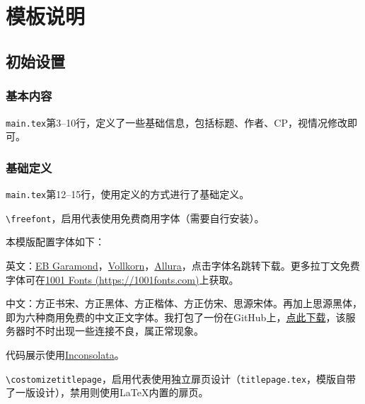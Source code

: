 \documentclass[10pt,openany]{book}
\title{\mytitleen\\\mytitle}
\author{\myauthor}
\date{}
\def\costomizetitlepage{} %
\begin{document}
\pagestyle{mystyle}

\ifdefined\costomizetitlepage
    
\else
    \maketitle
\fi

\tocgeo
\tableofcontents
\thispagestyle{empty}

\cleardoublepage
\setcounter{page}{1}
\restoregeometry

\part{模板说明}

\chapter{初始设置}

\section{基本内容}

\texttt{main.tex}第3--10行，定义了一些基础信息，包括标题、作者、CP，视情况修改即可。

\section{基础定义}

\texttt{main.tex}第12--15行，使用定义的方式进行了基础定义。

\texttt{\textbackslash freefont}，启用代表使用免费商用字体（需要自行安装）。

本模版配置字体如下：

英文：\href{https://www.1001fonts.com/eb-garamond-font.html}{EB Garamond}，\href{https://www.1001fonts.com/vollkorn-font.html}{Vollkorn}，\href{https://www.1001fonts.com/allura-font.html}{Allura}，点击字体名跳转下载。更多拉丁文免费字体可在\href{https://1001fonts.com}{1001 Fonts (https://1001fonts.com)}上获取。

中文：方正书宋、方正黑体、方正楷体、方正仿宋、思源宋体。再加上思源黑体，即为六种商用免费的中文正文字体。我打包了一份在GitHub上，\href{https://github.com/zhuty18/fanfiction-sample/releases/latest/download/fonts.zip}{点此下载}，该服务器时不时出现一些连接不良，属正常现象。

代码展示使用\href{https://www.1001fonts.com/inconsolata-font.html}{Inconsolata}。

\texttt{\textbackslash costomizetitlepage}，启用代表使用独立扉页设计（\texttt{titlepage.tex}，模版自带了一版设计），禁用则使用\LaTeX 内置的扉页。
\end{document}
